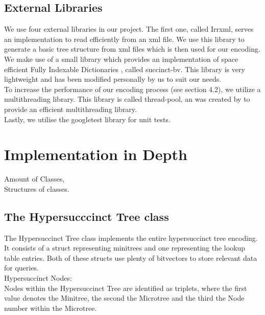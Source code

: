 \documentclass{article}
\begin{document}
\subsection{External Libraries}
We use four external libraries in our project.
The first one, called Irrxml, serves an implementation to read efficiently from an xml file. We use this library to generate a basic tree structure from xml files which is then used for our encoding.\\
We make use of a small library which provides an implementation of space efficient Fully Indexable Dictionaries 
\cite{universalSuccinct}, called succinct-bv.
This library is very lightweight and has been modified personally by us to suit our needs.\\
To increase the performance of our encoding process (see section 4.2), we utilize a multithreading library. This library is called thread-pool, an was created by
\cite{threading} to provide an efficient multithreading library.\\
Lastly, we utilise the googletest library for unit tests.

\section{Implementation in Depth}
Amount of Classes,\\
Structures of classes.
\subsection{The Hypersucccinct Tree class}
The Hypersuccinct Tree class implements the entire hypersuccinct tree encoding. It consists of a struct representing minitrees and one representing the lookup table entries.
Both of these structs use plenty of bitvectors to store relevant data for queries.\\

Hypersuccinct Nodes:\\
Nodes within the Hypersuccinct Tree are identified as triplets, where the first value denotes the Minitree, the second the Microtree and the third the Node number within the Microtree.\\
\end{document}
